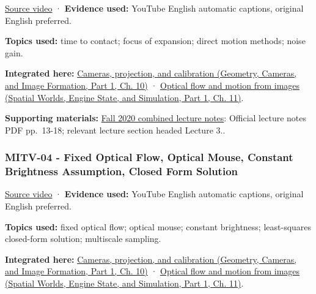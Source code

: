 \hypertarget{04-visual-computing-ii-ch036-mitv-03---time-to-contact-focus-of-expansion-direct-motion-vision-methods-noise-gain}{}

\href{https://www.youtube.com/watch?v=t9w_WuyVJ-A}{Source video} · \textbf{Evidence used:} YouTube English automatic captions, original English preferred.

\textbf{Topics used:} time to contact; focus of expansion; direct motion methods; noise gain.

\textbf{Integrated here:} \href{../03-Geometry-Cameras-and-Image-Formation-P01/main.pdf\#nameddest=03-visual-computing-i-ch003-cameras-projection-and-calibration}{Cameras, projection, and calibration (Geometry, Cameras, and Image Formation, Part 1, Ch. 10)} · \href{../05-Spatial-Worlds-Engine-State-and-Simulation-P01/main.pdf\#nameddest=04-visual-computing-ii-ch030-optical-flow-and-motion-from-images}{Optical flow and motion from images (Spatial Worlds, Engine State, and Simulation, Part 1, Ch. 11)}.

\textbf{Supporting materials:} \href{https://ocw.mit.edu/courses/6-801-machine-vision-fall-2020/9ec44f69e72995c370b3797818ba01e6_MIT6_801F20_lectureNotes.pdf}{Fall 2020 combined lecture notes}: Official lecture notes PDF pp.~13-18; relevant lecture section headed Lecture 3..

\subsubsection{MITV-04 - Fixed Optical Flow, Optical Mouse, Constant Brightness Assumption, Closed Form Solution}\label{04-visual-computing-ii-ch036-mitv-04---fixed-optical-flow-optical-mouse-constant-brightness-assumption-closed-form-solution}

\hypertarget{04-visual-computing-ii-ch036-mitv-04---fixed-optical-flow-optical-mouse-constant-brightness-assumption-closed-form-solution}{}

\href{https://www.youtube.com/watch?v=3NarS3QpaU0}{Source video} · \textbf{Evidence used:} YouTube English automatic captions, original English preferred.

\textbf{Topics used:} fixed optical flow; optical mouse; constant brightness; least-squares closed-form solution; multiscale sampling.

\textbf{Integrated here:} \href{../03-Geometry-Cameras-and-Image-Formation-P01/main.pdf\#nameddest=03-visual-computing-i-ch003-cameras-projection-and-calibration}{Cameras, projection, and calibration (Geometry, Cameras, and Image Formation, Part 1, Ch. 10)} · \href{../05-Spatial-Worlds-Engine-State-and-Simulation-P01/main.pdf\#nameddest=04-visual-computing-ii-ch030-optical-flow-and-motion-from-images}{Optical flow and motion from images (Spatial Worlds, Engine State, and Simulation, Part 1, Ch. 11)}.

